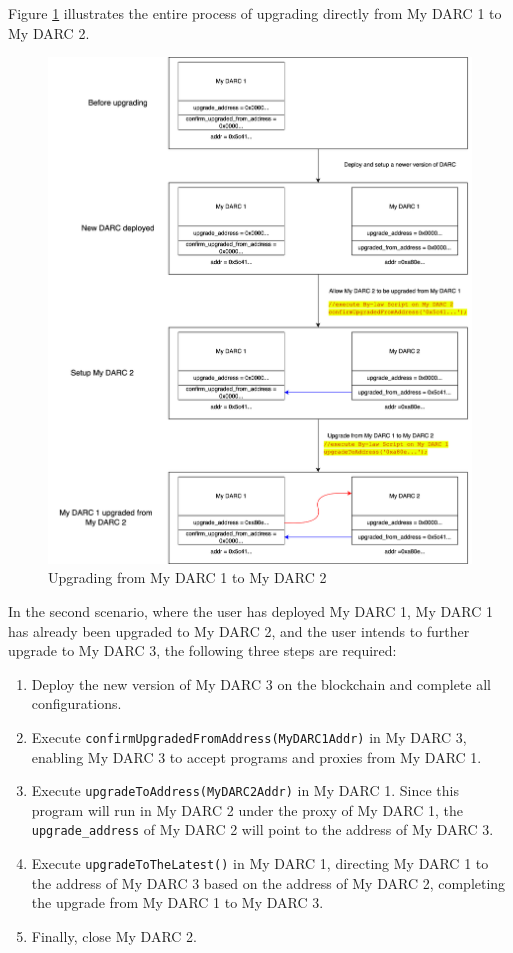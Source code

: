 \documentclass[main.tex]{subfiles}
\begin{document}
Figure \ref{fig:upgrade} illustrates the entire process of upgrading directly from My DARC 1 to My DARC 2.


\begin{figure}
\centering
\includegraphics[width=1\linewidth]{upgradability.drawio.png}
\caption{\label{fig:upgrade}Upgrading from My DARC 1 to My DARC 2}
\end{figure}


In the second scenario, where the user has deployed My DARC 1, My DARC 1 has already been upgraded to My DARC 2, and the user intends to further upgrade to My DARC 3, the following three steps are required:

\begin{enumerate}
    \item Deploy the new version of My DARC 3 on the blockchain and complete all configurations.
    \item Execute \texttt{confirmUpgradedFromAddress(MyDARC1Addr)} in My DARC 3, enabling My DARC 3 to accept programs and proxies from My DARC 1.
    \item Execute \texttt{upgradeToAddress(MyDARC2Addr)} in My DARC 1. Since this program will run in My DARC 2 under the proxy of My DARC 1, the \texttt{upgrade\_address} of My DARC 2 will point to the address of My DARC 3.
    \item Execute \texttt{upgradeToTheLatest()} in My DARC 1, directing My DARC 1 to the address of My DARC 3 based on the address of My DARC 2, completing the upgrade from My DARC 1 to My DARC 3.
    \item Finally, close My DARC 2.
\end{enumerate}
\end{document}
